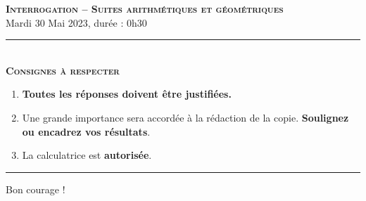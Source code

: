 \documentclass[11pt]{article}
\begin{document}

%
%
%

\begin{center}
\textbf{\LARGE \textsc{Interrogation -- Suites arithmétiques et
géométriques}}\\[2mm]

{\large Mardi 30 Mai 2023, durée : 0h30}\\[1mm]
\noindent\rule{8cm}{0.4pt}\\[1mm]
\textbf{\textsc{Consignes à respecter}}
\begin{enumerate}[label=\textbf{\arabic*/}]
\item \textbf{Toutes les réponses doivent être justifiées.}
\item Une grande importance sera accordée à la rédaction de la
  copie. \textbf{Soulignez ou encadrez vos résultats}.
\item La calculatrice est \textbf{autorisée}.
    \end{enumerate}
\noindent\rule{12cm}{0.4pt}
\end{center}

\begin{center}
  Bon courage !
\end{center}
\end{document}
